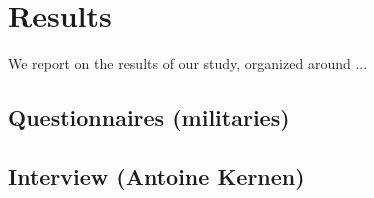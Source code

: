 \section{Results}
\label{results}

We report on the results of our study, organized around ...


\subsection{Questionnaires (militaries)}

\subsection{Interview (Antoine Kernen)}